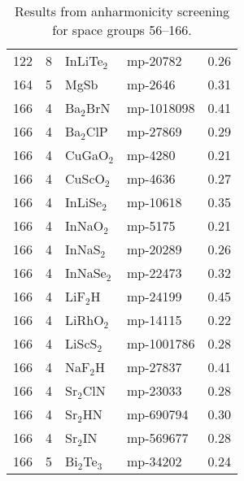 \begin{table*}[h!]
\begin{center}
\begin{tabular}{rrllr}
         122 &            8 &   InLiTe$_2$ &   mp-20782 &       0.26 \\
         164 &            5 &         MgSb &    mp-2646 &       0.31 \\
         166 &            4 &    Ba$_2$BrN & mp-1018098 &       0.41 \\
         166 &            4 &    Ba$_2$ClP &   mp-27869 &       0.29 \\
         166 &            4 &    CuGaO$_2$ &    mp-4280 &       0.21 \\
         166 &            4 &    CuScO$_2$ &    mp-4636 &       0.27 \\
         166 &            4 &   InLiSe$_2$ &   mp-10618 &       0.35 \\
         166 &            4 &    InNaO$_2$ &    mp-5175 &       0.21 \\
         166 &            4 &    InNaS$_2$ &   mp-20289 &       0.26 \\
         166 &            4 &   InNaSe$_2$ &   mp-22473 &       0.32 \\
         166 &            4 &     LiF$_2$H &   mp-24199 &       0.45 \\
         166 &            4 &    LiRhO$_2$ &   mp-14115 &       0.22 \\
         166 &            4 &    LiScS$_2$ & mp-1001786 &       0.28 \\
         166 &            4 &     NaF$_2$H &   mp-27837 &       0.41 \\
         166 &            4 &    Sr$_2$ClN &   mp-23033 &       0.28 \\
         166 &            4 &     Sr$_2$HN &  mp-690794 &       0.30 \\
         166 &            4 &     Sr$_2$IN &  mp-569677 &       0.28 \\
         166 &            5 & Bi$_2$Te$_3$ &   mp-34202 &       0.24 \\

\bottomrule
\end{tabular}
\end{center}
   \caption{Results from anharmonicity screening for space groups 56--166.}
   \label{tab:screening.sigma.1}
 \end{table*}         
  
